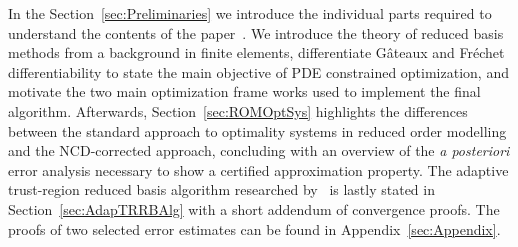 In the Section~\ref{sec:Preliminaries} we introduce the individual parts required to understand the contents of the paper~\cite{Keil2021}.
We introduce the theory of reduced basis methods from a background in finite elements, differentiate G\^{a}teaux and Fr\'{e}chet differentiability to state the main objective of PDE constrained optimization, and motivate the two main optimization frame works used to implement the final algorithm.
Afterwards, Section~\ref{sec:ROMOptSys} highlights the differences between the standard approach to optimality systems in reduced order modelling and the NCD-corrected approach, concluding with an overview of the \textit{a posteriori} error analysis necessary to show a certified approximation property.
The adaptive trust-region reduced basis algorithm researched by~\cite{Qian2017, Keil2021} is lastly stated in Section~\ref{sec:AdapTRRBAlg} with a short addendum of convergence proofs.
The proofs of two selected error estimates can be found in Appendix~\ref{sec:Appendix}.